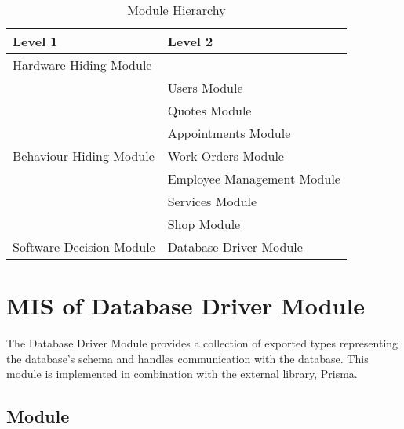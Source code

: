 \documentclass[12pt, titlepage]{article}
\begin{document}
\begin{table}[H]
	\centering
	\begin{tabular}{p{} p{}}
		\toprule
		\textbf{Level 1}                                      & \textbf{Level 2}           \\
		\midrule

		Hardware-Hiding Module                                & ~                          \\

		\midrule

		\multirow{7}{0.3\textwidth}{Behaviour-Hiding Module}  & Users Module               \\
		                                                      & Quotes Module              \\
		                                                      & Appointments Module        \\
		                                                      & Work Orders Module         \\
		                                                      & Employee Management Module \\
		                                                      & Services Module            \\
		                                                      & Shop Module                \\
		\midrule

		\multirow{1}{0.3\textwidth}{Software Decision Module} & Database Driver Module     \\

		\bottomrule
	\end{tabular}
	\caption{Module Hierarchy}
	\label{TblMH}
\end{table}

\newpage

\section{MIS of Database Driver Module} \label{mDBDriver}

The Database Driver Module provides a collection of exported types representing the database's
schema and handles communication with the database. This module is implemented in combination with
the external library, Prisma.

\subsection{Module}
\end{document}
